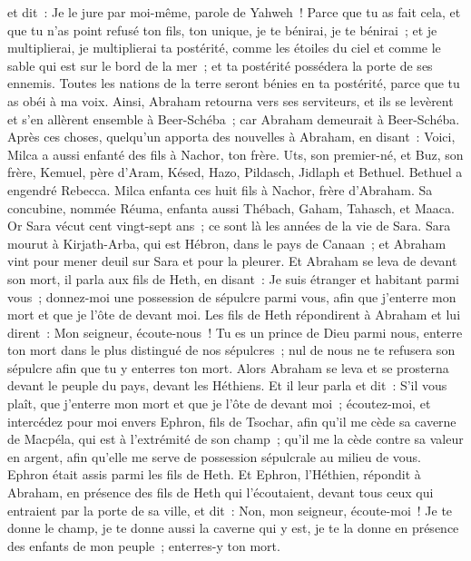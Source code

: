 \begin{multicols}{2}
et dit~: Je le jure par moi-même, parole de Yahweh~! Parce que tu as fait cela, et que tu n'as point refusé ton fils, ton unique,
je te bénirai, je te bénirai~; et je multiplierai, je multiplierai ta postérité, comme les étoiles du ciel et comme le sable qui est sur le bord de la mer~; et ta postérité possédera la porte de ses ennemis.
Toutes les nations de la terre seront bénies en ta postérité, parce que tu as obéi à ma voix.
Ainsi, Abraham retourna vers ses serviteurs, et ils se levèrent et s'en allèrent ensemble à Beer-Schéba~; car Abraham demeurait à Beer-Schéba.
Après ces choses, quelqu'un apporta des nouvelles à Abraham, en disant~: Voici, Milca a aussi enfanté des fils à Nachor, ton frère.
Uts, son premier-né, et Buz, son frère, Kemuel, père d'Aram,
Késed, Hazo, Pildasch, Jidlaph et Bethuel.
Bethuel a engendré Rebecca. Milca enfanta ces huit fils à Nachor, frère d'Abraham.
Sa concubine, nommée Réuma, enfanta aussi Thébach, Gaham, Tahasch, et Maaca.
\VerseOne{}Or Sara vécut cent vingt-sept ans~; ce sont là les années de la vie de Sara.
Sara mourut à Kirjath-Arba, qui est Hébron, dans le pays de Canaan~; et Abraham vint pour mener deuil sur Sara et pour la pleurer.
Et Abraham se leva de devant son mort, il parla aux fils de Heth, en disant~:
Je suis étranger et habitant parmi vous~; donnez-moi une possession de sépulcre parmi vous, afin que j'enterre mon mort et que je l'ôte de devant moi.
Les fils de Heth répondirent à Abraham et lui dirent~:
Mon seigneur, écoute-nous~! Tu es un prince de Dieu parmi nous, enterre ton mort dans le plus distingué de nos sépulcres~; nul de nous ne te refusera son sépulcre afin que tu y enterres ton mort.
Alors Abraham se leva et se prosterna devant le peuple du pays, devant les Héthiens.
Et il leur parla et dit~: S'il vous plaît, que j'enterre mon mort et que je l'ôte de devant moi~; écoutez-moi, et intercédez pour moi envers Ephron, fils de Tsochar,
afin qu'il me cède sa caverne de Macpéla, qui est à l'extrémité de son champ~; qu'il me la cède contre sa valeur en argent, afin qu'elle me serve de possession sépulcrale au milieu de vous.
Ephron était assis parmi les fils de Heth. Et Ephron, l'Héthien, répondit à Abraham, en présence des fils de Heth qui l'écoutaient, devant tous ceux qui entraient par la porte de sa ville, et dit~:
Non, mon seigneur, écoute-moi~! Je te donne le champ, je te donne aussi la caverne qui y est, je te la donne en présence des enfants de mon peuple~; enterres-y ton mort.

\end{multicols}
